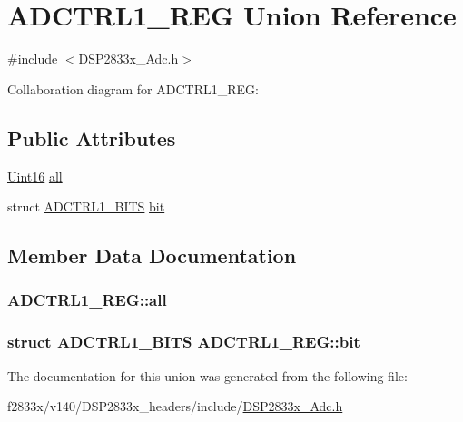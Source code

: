 \hypertarget{union_a_d_c_t_r_l1___r_e_g}{}\section{A\+D\+C\+T\+R\+L1\+\_\+\+R\+E\+G Union Reference}
\label{union_a_d_c_t_r_l1___r_e_g}


{\ttfamily \#include $<$D\+S\+P2833x\+\_\+\+Adc.\+h$>$}



Collaboration diagram for A\+D\+C\+T\+R\+L1\+\_\+\+R\+E\+G\+:
\subsection*{Public Attributes}
\begin{DoxyCompactItemize}
\item 
\hyperlink{_d_s_p2833x___device_8h_a59a9f6be4562c327cbfb4f7e8e18f08b}{Uint16} \hyperlink{union_a_d_c_t_r_l1___r_e_g_af8da8266a9d926b8203d16c7b2350c6b}{all}
\item 
struct \hyperlink{struct_a_d_c_t_r_l1___b_i_t_s}{A\+D\+C\+T\+R\+L1\+\_\+\+B\+I\+T\+S} \hyperlink{union_a_d_c_t_r_l1___r_e_g_a7ec7e1012eedb2de5930409a1bf610df}{bit}
\end{DoxyCompactItemize}


\subsection{Member Data Documentation}
\hypertarget{union_a_d_c_t_r_l1___r_e_g_af8da8266a9d926b8203d16c7b2350c6b}{}
\subsubsection[{all}]{ A\+D\+C\+T\+R\+L1\+\_\+\+R\+E\+G\+::all}\label{union_a_d_c_t_r_l1___r_e_g_af8da8266a9d926b8203d16c7b2350c6b}
\hypertarget{union_a_d_c_t_r_l1___r_e_g_a7ec7e1012eedb2de5930409a1bf610df}{}
\subsubsection[{bit}]{\setlength{\rightskip}{0pt plus 5cm}struct {\bf A\+D\+C\+T\+R\+L1\+\_\+\+B\+I\+T\+S} A\+D\+C\+T\+R\+L1\+\_\+\+R\+E\+G\+::bit}\label{union_a_d_c_t_r_l1___r_e_g_a7ec7e1012eedb2de5930409a1bf610df}


The documentation for this union was generated from the following file\+:\begin{DoxyCompactItemize}
\item 
f2833x/v140/\+D\+S\+P2833x\+\_\+headers/include/\hyperlink{_d_s_p2833x___adc_8h}{D\+S\+P2833x\+\_\+\+Adc.\+h}\end{DoxyCompactItemize}
